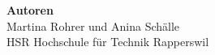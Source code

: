 \begin{titlepage}

\begin{adjustwidth}{-25mm}{-45mm}

\begin{adjustwidth}{60mm}{10mm}
\textsf{
	\vspace*{2cm}
	\begin{flushleft}
		\huge \textbf{Technischer Bericht}\\
		\vspace{.25cm}
		\Large Einarmiger Bandit\\
	  \end{flushleft}
}
\end{adjustwidth}

\begin{adjustwidth}{35mm}{40mm}	
    \vspace{12cm}
    \large
		\textsf{\textbf{Autoren}}\\
	  \textsf{Martina Rohrer und Anina Schälle}\\
		\textsf{HSR Hochschule für Technik Rapperswil}\\
    \hfill\hbox{}\\
\end{adjustwidth}

\end{adjustwidth}

\newpage								
\thispagestyle{empty}
\mbox{}

\end{titlepage}
